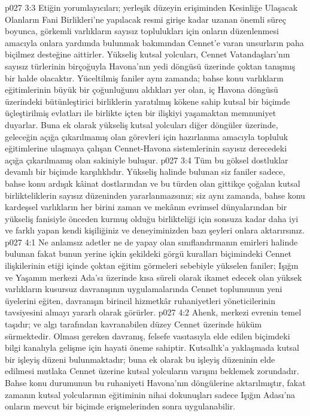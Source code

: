 \vs p027 3:3 Etiğin yorumlayıcıları; yerleşik düzeyin erişiminden Kesinliğe Ulaşacak Olanların Fani Birlikleri’ne yapılacak resmi girişe kadar uzanan önemli süreç boyunca, görkemli varlıkların sayısız toplulukları için onların düzenlenmesi amacıyla onlara yardımda bulunmak bakımından Cennet’e varan unsurların paha biçilmez desteğine aittirler. Yükseliş kutsal yolcuları, Cennet Vatandaşları’nın sayısız türlerinin birçoğuyla Havona’nın yedi döngüsü üzerinde çoktan tanışmış bir halde olacaktır. Yüceltilmiş faniler aynı zamanda; bahse konu varlıkların eğitimlerinin büyük bir çoğunluğunu aldıkları yer olan, iç Havona döngüsü üzerindeki bütünleştirici birliklerin yaratılmış kökene sahip kutsal bir biçimde üçleştirilmiş evlatları ile birlikte içten bir ilişkiyi yaşamaktan memnuniyet duyarlar. Buna ek olarak yükseliş kutsal yolcuları diğer döngüler üzerinde, geleceğin açığa çıkarılmamış olan görevleri için hazırlanma amacıyla topluluk eğitimlerine ulaşmaya çalışan Cennet\hyp{}Havona sistemlerinin sayısız derecedeki açığa çıkarılmamış olan sakiniyle buluşur.
\vs p027 3:4 Tüm bu göksel dostluklar devamlı bir biçimde karşılıklıdır. Yükseliş halinde bulunan siz faniler sadece, bahse konu ardışık kâinat dostlarından ve bu türden olan gittikçe çoğalan kutsal birlikteliklerin sayısız düzeninden yararlanmazsınız; siz aynı zamanda, bahse konu kardeşsel varlıkların her birini zaman ve mekânın evrimsel dünyalarından bir yükseliş fanisiyle önceden kurmuş olduğu birlikteliği için sonsuza kadar daha iyi ve farklı yapan kendi kişiliğiniz ve deneyiminizden bazı şeyleri onlara aktarırsınız.
\vs p027 4:1 Ne anlamsız adetler ne de yapay olan sınıflandırmanın emirleri halinde bulunan fakat bunun yerine içkin şekildeki görgü kuralları biçimindeki Cennet ilişkilerinin etiği içinde çoktan eğitim görmeleri sebebiyle yükselen faniler; Işığın ve Yaşamın merkezi Ada’sı üzerinde kısa süreli olarak ikamet edecek olan yüksek varlıkların kusursuz davranışının uygulamalarında Cennet toplumunun yeni üyelerini eğiten, davranışın birincil hizmetkâr ruhaniyetleri yöneticilerinin tavsiyesini almayı yararlı olarak görürler.
\vs p027 4:2 Ahenk, merkezi evrenin temel taşıdır; ve algı tarafından kavranabilen düzey Cennet üzerinde hüküm sürmektedir. Olması gereken davranış, felsefe vasıtasıyla elde edilen biçimdeki bilgi kanalıyla gelişme için hayati öneme sahiptir. Kutsallık’a yaklaşmada kutsal bir işleyiş düzeni bulunmaktadır; buna ek olarak bu işleyiş düzeninin elde edilmesi mutlaka Cennet üzerine kutsal yolcuların varışını beklemek zorundadır. Bahse konu durumunun bu ruhaniyeti Havona’nın döngülerine aktarılmıştır, fakat zamanın kutsal yolcularının eğitiminin nihai dokunuşları sadece Işığın Adası’na onların mevcut bir biçimde erişmelerinden sonra uygulanabilir.
